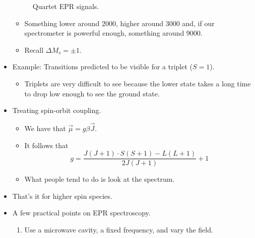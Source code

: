 \documentclass[../notes.tex]{subfiles}
\begin{document}
\begin{itemize}
\begin{figure}[H]
        \caption{Quartet EPR signals.}
        \label{fig:EPRquartet}
    \end{figure}
    \begin{itemize}
        \item Something lower around \SI{2000}{\gauss}, higher around \SI{3000}{\gauss} and, if our spectrometer is powerful enough, something around \SI{9000}{\gauss}.
        \item Recall $\Delta M_s=\pm 1$.
    \end{itemize}
    \item Example: Transitions predicted to be visible for a triplet ($S=1$).
    \begin{itemize}
        \item Triplets are very difficult to see because the lower state takes a long time to drop low enough to see the ground state.
    \end{itemize}
    \item Treating spin-orbit coupling.
    \begin{itemize}
        \item We have that $\vec{\mu}=g\beta\vec{J}$.
        \item It follows that
        \begin{equation*}
            g = \frac{J(J+1)\cdot S(S+1)-L(L+1)}{2J(J+1)}+1
        \end{equation*}
        \item What people tend to do is look at the spectrum.
    \end{itemize}
    \item That's it for higher spin species.
    \item A few practical points on EPR spectroscopy.
    \begin{enumerate}
        \item Use a microwave cavity, a fixed frequency, and vary the field.

\end{enumerate}
\end{itemize}
\end{document}
